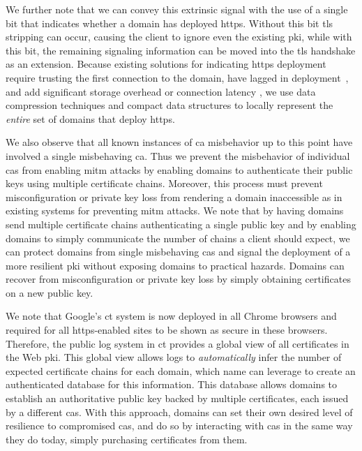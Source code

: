 We further note that we can convey this extrinsic signal with the use of a
single bit that indicates whether a domain has deployed \ac{https}. Without this
bit \ac{tls} stripping can occur, causing the client to ignore even the existing
\ac{pki}, while with this bit, the remaining signaling information can be moved
into the \ac{tls} handshake as an extension. Because existing solutions for
indicating \ac{https} deployment require trusting the first connection to the
domain, have lagged in deployment~\cite{rfc4033, rfc6698}, and add significant
storage overhead  or connection latency , we use data compression techniques and compact data structures to
locally represent the \emph{entire} set of domains that deploy \ac{https}.

We also observe that all known instances of \ac{ca} misbehavior up to this point
have involved a single misbehaving \ac{ca}. Thus we prevent the misbehavior
of individual \acp{ca} from enabling \ac{mitm} attacks by enabling domains to
authenticate their public keys using multiple certificate chains. Moreover, this
process must prevent misconfiguration or private key loss from rendering a
domain inaccessible as in existing systems for preventing \ac{mitm} attacks. We
note that by having domains send multiple certificate chains authenticating a
single public key and by enabling domains to simply communicate the number of
chains a client should expect, we can protect domains from single misbehaving
\acp{ca} and signal the deployment of a more resilient \ac{pki} without exposing
domains to practical hazards. Domains can recover from misconfiguration or
private key loss by simply obtaining certificates on a new public key.

We note that Google's \ac{ct} system is now deployed in all Chrome browsers and
required for all \ac{https}-enabled sites to be shown as secure in these
browsers. Therefore, the public log system in \ac{ct} provides a global view of
all certificates in the Web \ac{pki}. This global view allows logs to
\emph{automatically} infer the number of expected certificate chains for each
domain, which \ac{name} can leverage to create an authenticated database for
this information. This database allows domains to establish an authoritative
public key backed by multiple certificates, each issued by a different \acp{ca}.
With this approach, domains can set their own desired level of resilience to
compromised \acp{ca}, and do so by interacting with \acp{ca} in the same way
they do today, simply purchasing certificates from them.

